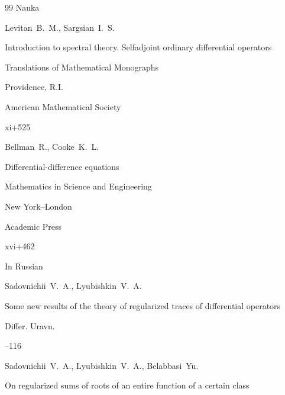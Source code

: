 \begin{thebibliography}{99}
\publ Nauka









\by Levitan~B.~M., Sargsian~I.~S.

\book Introduction to spectral theory. Selfadjoint ordinary differential operators

\serial Translations of Mathematical Monographs


\publaddr Providence, R.I.

\publ American Mathematical Society 

\totalpages xi+525 





\by Bellman~R., Cooke~K.~L.

\book Differential-difference equations


\serial Mathematics in Science and Engineering


\publaddr New York--London

\publ Academic Press

\totalpages xvi+462 





\lang In Russian

\by Sadovnichii~V.~A., Lyubishkin~V.~A.

\paper Some new results of the theory of regularized traces of differential operators

\jour Differ. Uravn.




--116




\by Sadovnichii~V.~A., Lyubishkin~V.~A., Belabbasi~Yu.

\paper On regularized sums of roots of an entire function of a certain class


\end{thebibliography}
